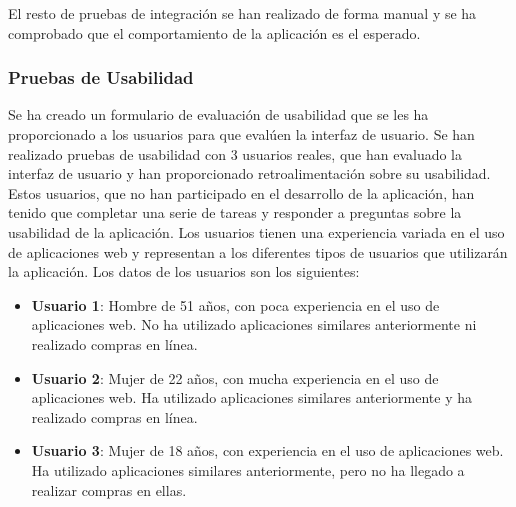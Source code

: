 El resto de pruebas de integración se han realizado de forma manual y se ha comprobado que el comportamiento de la aplicación es el esperado.

\subsubsection{Pruebas de Usabilidad}
Se ha creado un formulario de evaluación de usabilidad que se les ha proporcionado a los usuarios para que evalúen la interfaz de usuario.
Se han realizado pruebas de usabilidad con 3 usuarios reales, que han evaluado la interfaz de usuario y han proporcionado retroalimentación sobre su usabilidad.
Estos usuarios, que no han participado en el desarrollo de la aplicación, han tenido que completar una serie de tareas y responder a preguntas sobre la usabilidad de la aplicación.
Los usuarios tienen una experiencia variada en el uso de aplicaciones web y representan a los diferentes tipos de usuarios que utilizarán la aplicación.
Los datos de los usuarios son los siguientes:
\begin{itemize}
    \item \textbf{Usuario 1}: Hombre de 51 años, con poca experiencia en el uso de aplicaciones web. No ha utilizado aplicaciones similares anteriormente ni realizado compras en línea.
    \item \textbf{Usuario 2}: Mujer de 22 años, con mucha experiencia en el uso de aplicaciones web. Ha utilizado aplicaciones similares anteriormente y ha realizado compras en línea.
    \item \textbf{Usuario 3}: Mujer de 18 años, con experiencia en el uso de aplicaciones web. Ha utilizado aplicaciones similares anteriormente, pero no ha llegado a realizar compras en ellas.
\end{itemize}

